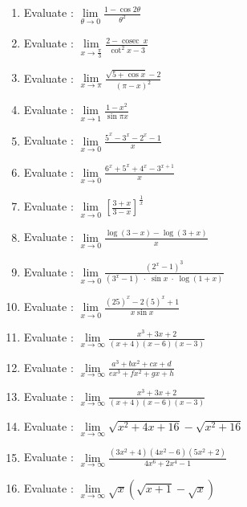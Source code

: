 \documentclass[14pt]{article}
\begin{document}
\begin{multicols}{2}
\begin{enumerate}[resume]
 \item Evaluate : $ \lim\limits_{ \theta \to 0} \frac{ 1 -  \cos 2\theta }{ \theta ^2  } $
 
\item Evaluate : $ \lim\limits_{ x \to \frac {\pi}{3} } \frac{ 2 -  \operatorname{cosec} \ x }{ \cot^2 x - 3  } $
 
\item Evaluate : $ \lim\limits_{ x \to \pi } \frac{ \sqrt{ 5 + \cos x } -2 }{ ( \pi - x )^2  } $
 
\item Evaluate : $ \lim\limits_{ x \to 1 } \frac{ 1 - x^2 }{ \sin \pi x  } $
 
 
 
 \item Evaluate : $ \lim\limits_{ x \to 0 } \frac{ 5^x - 3^x - 2^x - 1 }{ x} $
 
 \item Evaluate : $ \lim\limits_{ x \to 0 } \frac{ 6^x + 5^x + 4^x - 3^{x+1} }{ x} $
 
 \item Evaluate : $ \lim\limits_{ x \to 0 } \left[ \frac{ 3+x }{3-x}\right]^{\frac{1}{x}} $
 

  \item Evaluate : $ \lim\limits_{ x \to 0 } \frac{ \log (3-x) - \log (3+x) }{ x} $
  
  
   \item Evaluate : $ \lim\limits_{ x \to 0 } \frac{ \left(2^x - 1\right)^3 }{ (3^x - 1)\; \cdot \;\sin x \; \cdot \; \log (1+x)} $
  
  
 \item Evaluate : $ \lim\limits_{ x \to 0 } \frac{ (25)^x - 2(5)^x +1}{ x\sin x} $
 \item Evaluate : $ \lim\limits_{ x \to \infty} \frac{x^3+ 3x+2}{(x+4)(x-6)(x-3)} $

 \item Evaluate : $ \lim\limits_{ x \to \infty } \frac{ a^3 + bx^2+cx +d}{ ex^3+fx^2+gx+h} $

 \item Evaluate : $ \lim\limits_{ x \to \infty} \frac{x^3+ 3x+2}{(x+4)(x-6)(x-3)} $

\item Evaluate : $ \lim\limits_{ x \to \infty } \sqrt{x^2+4x+16} - \sqrt{ x^2+16} $

\item Evaluate : $ \lim\limits_{ x \to \infty} \frac{(3x^2+4)(4x^2-6)(5x^2+2)}{4x^6+2x^4-1} $

\item Evaluate : $ \lim\limits_{ x \to \infty }\sqrt{x}\left( \sqrt{x+1} - \sqrt{x}\right) $

\end{enumerate} 



\end{multicols}
 
\end{document}
